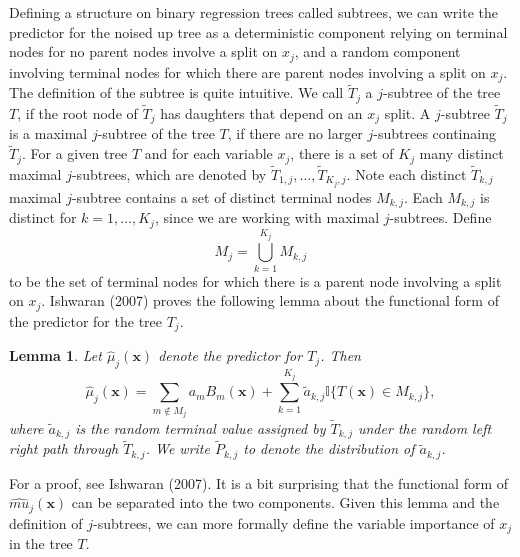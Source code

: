\documentclass[12pt,twoside]{reedthesis}
\newtheorem{lemma}{Lemma}[chapter]
\theoremstyle{definition}
\theoremstyle{definition}
\theoremstyle{definition}
\theoremstyle{remark}
\begin{document}
Defining a structure on binary regression trees called subtrees, we can
write the predictor for the noised up tree as a deterministic component
relying on terminal nodes for no parent nodes involve a split on
\(x_j\), and a random component involving terminal nodes for which there
are parent nodes involving a split on \(x_j\). The definition of the
subtree is quite intuitive. We call \(\tilde{T}_j\) a \(j\)-subtree of
the tree \(T\), if the root node of \(\tilde{T}_j\) has daughters that
depend on an \(x_j\) split. A \(j\)-subtree \(\tilde{T}_j\) is a maximal
\(j\)-subtree of the tree \(T\), if there are no larger \(j\)-subtrees
continaing \(\tilde{T}_j\). For a given tree \(T\) and for each variable
\(x_j\), there is a set of \(K_j\) many distinct maximal \(j\)-subtrees,
which are denoted by \(\tilde{T}_{1,j},\ldots, \tilde{T}_{K_j,j}\). Note
each distinct \(\tilde{T}_{k,j}\) maximal \(j\)-subtree contains a set
of distinct terminal nodes \(M_{k,j}\). Each \(M_{k,j}\) is distinct for
\(k=1,\ldots,K_j\), since we are working with maximal \(j\)-subtrees.
Define \[M_j=\bigcup_{k=1}^{K_j} M_{k,j}\] to be the set of terminal
nodes for which there is a parent node involving a split on \(x_j\).
Ishwaran (2007) proves the following lemma about the functional form of
the predictor for the tree \(T_j\).
\begin{lemma}
Let $\hat{\mu}_j(\mathbf{x})$ denote the predictor for $T_j$. Then $$\hat{\mu}_j(\mathbf{x})=\sum_{m\notin M_j}a_m B_m(\mathbf{x})+\sum_{k=1}^{K_j} \tilde{a}_{k,j}\mathbb{I}\{T(\mathbf{x})\in M_{k,j}\},$$ where $\tilde{a}_{k,j}$ is the random terminal value assigned by $\tilde{T}_{k,j}$ under the random left right path through $\tilde{T}_{k,j}$. We write $\tilde{P}_{k,j}$ to denote the distribution of $\tilde{a}_{k,j}$. 
\end{lemma}
For a proof, see Ishwaran (2007). It is a bit surprising that the
functional form of \(\hat{mu}_j(\mathbf{x})\) can be separated into the
two components. Given this lemma and the definition of \(j\)-subtrees,
we can more formally define the variable importance of \(x_j\) in the
tree \(T\).
\end{document}
